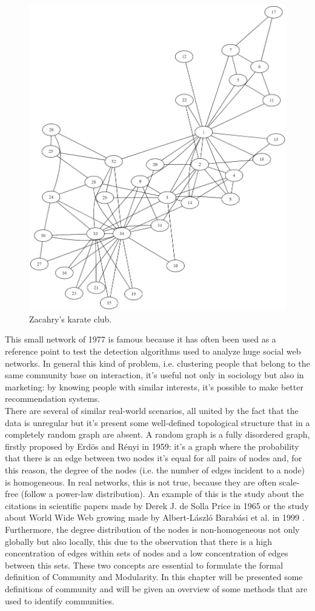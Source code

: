 \begin{figure}
	\centering
	\includegraphics[width=0.6\linewidth]{0-resources/karateclub}
	\caption{Zacahry's karate club. \cite{Zac77}}
	\label{fig:karateclub}
\end{figure}
This small network of 1977 is famous because it has often been used as a reference point to test the detection algorithms used to analyze huge social web networks.
In general this kind of problem, i.e. clustering people that belong to the same community base on interaction, it's useful not only in sociology but also in marketing: by knowing people with similar interests, it's possible to make better recommendation systems.\\
There are several of similar real-world scenarios, all united by the fact that the data is unregular but it's present some well-defined topological structure that in a completely random graph are absent. A random graph is a fully disordered graph, firstly proposed by Erdös and Rényi \cite{random} in 1959: it's a graph where the probability that there is an edge between two nodes it's equal for all pairs of nodes and, for this reason, the degree of the nodes (i.e. the number of edges incident to a node) is homogeneous. In real networks, this is not true, because they are often scale-free (follow a power-law distribution). An example of this is the study about the citations in scientific papers made by Derek J. de Solla Price in 1965 \cite{dsp} or the study about World Wide Web growing made by Albert-László Barabási et al. in 1999 \cite{Barab}.
Furthermore, the degree distribution of the nodes is non-homogeneous not only globally but also locally, this due to the observation that there is a high concentration of edges within sets of nodes and a low concentration of edges between this sets. These two concepts are essential to formulate the formal definition of Community and Modularity. In this chapter will be presented some definitions of community and will be given an overview of some methods that are used to identify communities.
